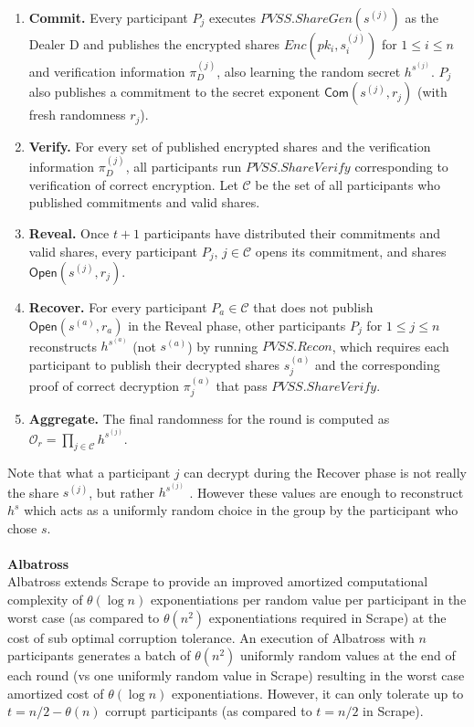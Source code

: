 \documentclass[letterpaper,twocolumn,10pt]{article}
\theoremstyle{definition}
\theoremstyle{remark}
\begin{document}
\begin{enumerate}
\item \textbf{Commit.} Every participant $P_j$ executes $PVSS.ShareGen(s^{(j)})$ as the Dealer D and publishes the encrypted shares $Enc(pk_i, s^{(j)}_i)$ for $1 \le i \le n$ and verification information $\pi_D^{(j)}$, also learning the random secret $h^{s^{(j)}}$. $P_j$ also publishes a commitment to the secret exponent $\mathsf{Com}(s^{(j)}, r_j)$ (with fresh randomness $r_j$).
\item \textbf{Verify.} For every set of published encrypted shares and the verification information $\pi_D^{(j)}$, all participants run $PVSS.ShareVerify$ corresponding to verification of correct encryption. Let $\mathcal{C}$ be the set of all participants who published commitments and valid shares.
\item \textbf{Reveal.} Once $t+1$ participants have distributed their commitments and valid shares, every participant $P_j$, $j \in \mathcal{C}$ opens its commitment, and shares $\mathsf{Open}(s^{(j)}, r_j)$.
\item \textbf{Recover.} For every participant $P_a \in \mathcal{C}$ that does not publish $\mathsf{Open}(s^{(a)}, r_a)$ in the Reveal phase, other participants $P_j$ for $1 \leq j \leq n$ reconstructs $h^{s^{(a)}}$ (not $s^{(a)}$) by running $PVSS.Recon$, which requires each participant to publish their decrypted shares $s_j^{(a)}$ and the corresponding proof of correct decryption $\pi_j^{(a)}$ that pass $PVSS.ShareVerify$.

\item \textbf{Aggregate.} The final randomness for the round is computed as $\mathcal{O}_r = \prod_{j \in \mathcal{C}} h^{s^{(j)}}$.
\end{enumerate}
Note that what a participant $j$ can decrypt during the Recover phase is not really the share $s^{(j)}$, but rather $h^{s^{(j)}}$ . However these values are enough to reconstruct $h^s$ which acts as a uniformly random choice in the group by the participant who chose $s$. \\\\
\textbf{Albatross}\\
Albatross extends Scrape to provide an improved amortized computational complexity of $\theta(\log n)$ exponentiations per random value per participant in the worst case (as compared to $\theta(n^2)$ exponentiations required in Scrape) at the cost of sub optimal corruption tolerance. An execution of Albatross with $n$ participants generates a batch of $\theta(n^2)$ uniformly random values at the end of each round (vs one uniformly random value in Scrape) resulting in the worst case amortized cost of $\theta(\log n)$ exponentiations. However, it can only tolerate up to $t = n/2 - \theta(n)$ corrupt participants (as compared to $t = n/2$ in Scrape).
\end{document}
